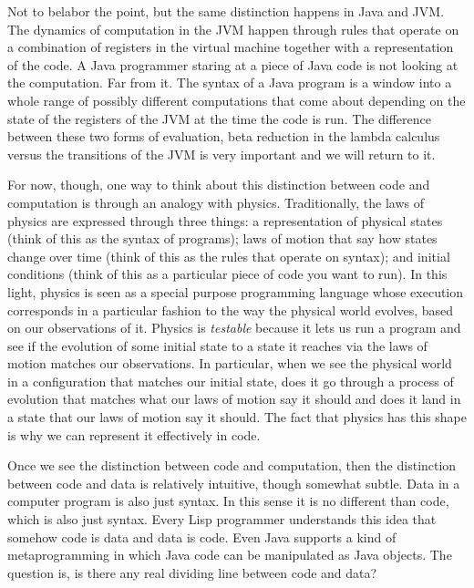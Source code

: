 \documentclass[10pt]{report}
\begin{document}
\vspace{1\baselineskip}
Not to belabor the point, but the same distinction happens in Java and JVM. The dynamics of computation in the JVM happen through rules that operate on a combination of registers in the virtual machine together with a representation of the code. A Java programmer staring at a piece of Java code is not looking at the computation. Far from it. The syntax of a Java program is a window into a whole range of possibly different computations that come about depending on the state of the registers of the JVM at the time the code is run. The difference between these two forms of evaluation, beta reduction in the lambda calculus versus the transitions of the JVM is very important and we will return to it.

\vspace{1\baselineskip}
For now, though, one way to think about this distinction between code and computation is through an analogy with physics. Traditionally, the laws of physics are expressed through three things: a representation of physical states (think of this as the syntax of programs); laws of motion that say how states change over time (think of this as the rules that operate on syntax); and initial conditions (think of this as a particular piece of code you want to run). In this light, physics is seen as a special purpose programming language whose execution corresponds in a particular fashion to the way the physical world evolves, based on our observations of it. Physics is \textit{testable} because it lets us run a program and see if the evolution of some initial state to a state it reaches via the laws of motion matches our observations. In particular, when we see the physical world in a configuration that matches our initial state, does it go through a process of evolution that matches what our laws of motion say it should and does it land in a state that our laws of motion say it should. The fact that physics has this shape is why we can represent it effectively in code.

\vspace{1\baselineskip}
Once we see the distinction between code and computation, then the distinction between code and data is relatively intuitive, though somewhat subtle. Data in a computer program is also just syntax. In this sense it is no different than code, which is also just syntax. Every Lisp programmer understands this idea that somehow code is data and data is code. Even Java supports a kind of metaprogramming in which Java code can be manipulated as Java objects. The question is, is there any real dividing line between code and data? 
\end{document}

